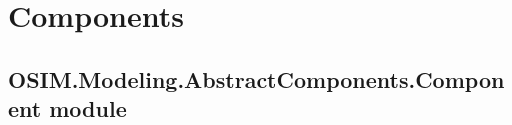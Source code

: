 \documentclass[letterpaper,12pt,english]{sphinxmanual}
\begin{document}
\section{Components}
\label{\detokenize{Modeling/Components::doc}}\label{\detokenize{Modeling/Components:components}}

\subsection{OSIM.Modeling.AbstractComponents.Component module}
\label{\detokenize{Modeling/Components:osim-modeling-abstractcomponents-component-module}}\label{\detokenize{Modeling/Components:module-Modeling.AbstractComponents.Component}}
\end{document}
